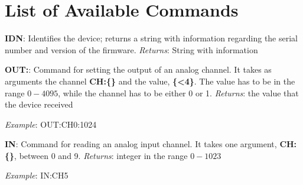 \section{List of Available Commands}\label{sec:list-of-commandsavailable}
\textbf{{IDN}}: Identifies the device; returns a string with information regarding the serial number and version of the firmware. \emph{Returns}: String with information

\textbf{{OUT}:}: Command for setting the output of an analog channel. It takes as arguments the channel \textbf{{CH}:\{\}} and the value, \textbf{\{\textless{}4\}}. The value has to be in the range $0-4095$, while the channel has to be either 0 or 1. \emph{Returns}: the value that the device received

\emph{Example}: {OUT}:{CH0}:1024

\textbf{{IN}}: Command for reading an analog input channel. It takes one argument, \textbf{{CH}:\{\}}, between 0 and 9. \emph{Returns}: integer in the range $0-1023$

\emph{Example}: {IN}:{CH5}
